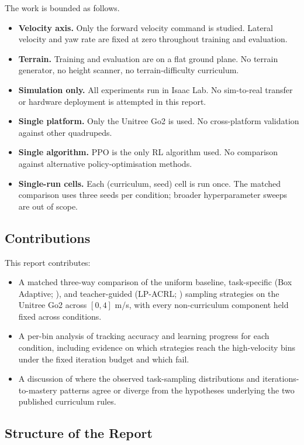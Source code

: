 The work is bounded as follows.
\begin{itemize}
  \item \textbf{Velocity axis.} Only the forward velocity command is studied. Lateral velocity and yaw rate are fixed at zero throughout training and evaluation.
  \item \textbf{Terrain.} Training and evaluation are on a flat ground plane. No terrain generator, no height scanner, no terrain-difficulty curriculum.
  \item \textbf{Simulation only.} All experiments run in Isaac Lab. No sim-to-real transfer or hardware deployment is attempted in this report.
  \item \textbf{Single platform.} Only the Unitree Go2 is used. No cross-platform validation against other quadrupeds.
  \item \textbf{Single algorithm.} PPO is the only RL algorithm used. No comparison against alternative policy-optimisation methods.
  \item \textbf{Single-run cells.} Each (curriculum, seed) cell is run once. The matched comparison uses three seeds per condition; broader hyperparameter sweeps are out of scope.
\end{itemize}

\subsection{Contributions}

This report contributes:
\begin{itemize}
  \item A matched three-way comparison of the uniform baseline, task-specific (Box Adaptive; \cite{margolis2022}), and teacher-guided (LP-ACRL; \cite{li2026}) sampling strategies on the Unitree Go2 across $[0, 4]$ m/s, with every non-curriculum component held fixed across conditions.
  \item A per-bin analysis of tracking accuracy and learning progress for each condition, including evidence on which strategies reach the high-velocity bins under the fixed iteration budget and which fail.
  \item A discussion of where the observed task-sampling distributions and iterations-to-mastery patterns agree or diverge from the hypotheses underlying the two published curriculum rules.
\end{itemize}

\subsection{Structure of the Report}

